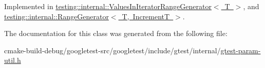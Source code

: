 Implemented in \mbox{\hyperlink{classtesting_1_1internal_1_1ValuesInIteratorRangeGenerator_a4af95b9eccfc86c40a715df2d9d0df40}{testing\+::internal\+::\+Values\+In\+Iterator\+Range\+Generator$<$ T $>$}}, and \mbox{\hyperlink{classtesting_1_1internal_1_1RangeGenerator_a8d2acbb733791a14df6e7bd3754e9003}{testing\+::internal\+::\+Range\+Generator$<$ T, Increment\+T $>$}}.



The documentation for this class was generated from the following file\+:\begin{DoxyCompactItemize}
\item 
cmake-\/build-\/debug/googletest-\/src/googletest/include/gtest/internal/\mbox{\hyperlink{gtest-param-util_8h}{gtest-\/param-\/util.\+h}}\end{DoxyCompactItemize}
